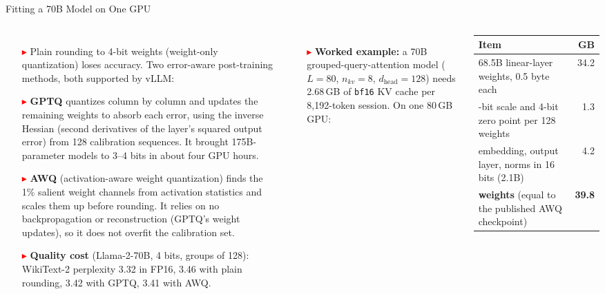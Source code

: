 \begin{frame}{Fitting a 70B Model on One GPU}
  \begin{columns}[T,onlytextwidth]
      \begin{itemize}\scriptsize\itemsep0.3em
        \item[\textcolor{red}{$\blacktriangleright$}] Plain rounding to 4-bit weights (weight-only quantization) loses accuracy. Two error-aware post-training methods, both supported by vLLM:
        \item[\textcolor{red}{$\blacktriangleright$}] \textbf{GPTQ} quantizes column by column and updates the remaining weights to absorb each error, using the inverse Hessian (second derivatives of the layer's squared output error) from 128 calibration sequences. It brought 175B-parameter models to 3--4 bits in about four GPU hours.
        \item[\textcolor{red}{$\blacktriangleright$}] \textbf{AWQ} (activation-aware weight quantization) finds the 1\% salient weight channels from activation statistics and scales them up before rounding. It relies on no backpropagation or reconstruction (GPTQ's weight updates), so it does not overfit the calibration set.
        \item[\textcolor{red}{$\blacktriangleright$}] \textbf{Quality cost} (Llama-2-70B, 4 bits, groups of 128): WikiText-2 perplexity 3.32 in FP16, 3.46 with plain rounding, 3.42 with GPTQ, 3.41 with AWQ.
      \end{itemize}
      \begin{itemize}\scriptsize
        \item[\textcolor{red}{$\blacktriangleright$}] \textbf{Worked example:} a 70B grouped-query-attention model ($L = 80$, $n_{kv} = 8$, $d_{\text{head}} = 128$) needs 2.68\,GB of \texttt{bf16} KV cache per 8,192-token session. On one 80\,GB GPU:
      \end{itemize}
      {\centering\scriptsize\setlength{\tabcolsep}{3pt}
      \begin{tabular}{>{\raggedright\arraybackslash}p{6.0cm} r}
        \toprule
        \textbf{Item} & \textbf{GB} \\
        \midrule
        68.5B linear-layer weights, 0.5 byte each & 34.2 \\
        16-bit scale and 4-bit zero point per 128 weights & 1.3 \\
        embedding, output layer, norms in 16 bits (2.1B) & 4.2 \\
        \textbf{weights} (equal to the published AWQ checkpoint) & \textbf{39.8} \\

\end{tabular}}
\end{columns}
\end{frame}
